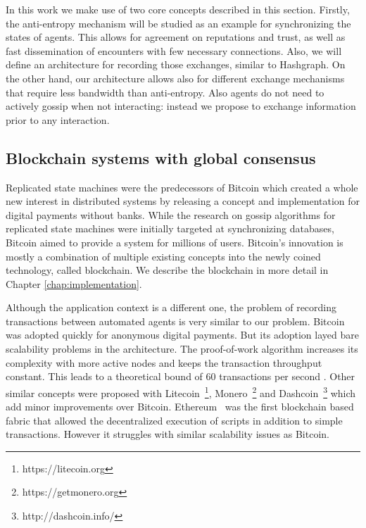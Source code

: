 In this work we make use of two core concepts described in this section. Firstly, the anti-entropy
mechanism will be studied as an example for synchronizing the states of agents. This allows for 
agreement on reputations and trust, as well as fast dissemination of encounters with few necessary
connections. Also, we will define an architecture for recording those exchanges, similar to Hashgraph.
On the other hand, our architecture allows also for different exchange mechanisms that require less
bandwidth than anti-entropy. Also agents do not need to actively gossip when not interacting: instead
we propose to exchange information prior to any interaction.

\subsection{Blockchain systems with global consensus}
Replicated state machines were the predecessors of Bitcoin\cite{nakamoto2008bitcoin} which created 
a whole new interest in distributed systems by releasing a concept and implementation for digital payments 
without banks. While the research on gossip algorithms for replicated state machines were initially
targeted at synchronizing databases, Bitcoin aimed to provide a system for millions of users. Bitcoin's
innovation is mostly a combination of
multiple existing concepts into the newly coined technology, called blockchain. We describe the 
blockchain in more detail in Chapter \ref{chap:implementation}.

Although the application context is a different one, the problem of recording transactions between
automated agents is very similar to our problem. Bitcoin was adopted quickly for anonymous digital 
payments. But its adoption layed bare scalability problems in the architecture. The proof-of-work
algorithm increases its complexity with more active nodes and keeps the transaction throughput 
constant. This leads to a theoretical bound of 60 transactions per second \cite{gervais2016security}. 
Other similar concepts were proposed with Litecoin~\footnote{https://litecoin.org}, Monero~\footnote{https://getmonero.org}
and Dashcoin~\footnote{http://dashcoin.info/} which add minor improvements over Bitcoin.
Ethereum~\cite{wood2014ethereum} was the first blockchain based fabric that allowed the decentralized
execution of scripts in addition to simple transactions. However it struggles with similar scalability
issues as Bitcoin.

